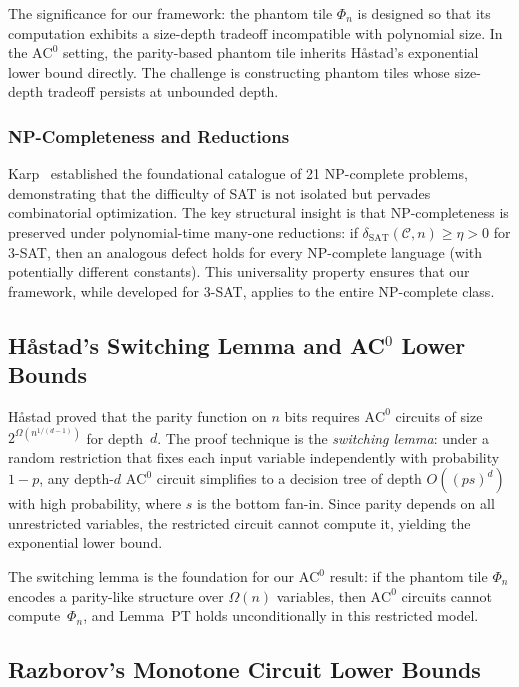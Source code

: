 \documentclass[11pt]{article}
\theoremstyle{definition}
\theoremstyle{remark}
\newcommand{\calC}{\mathcal{C}}
\newcommand{\ACz}{\mathrm{AC}^0}
\newcommand{\dSAT}{\delta_{\mathrm{SAT}}}
\begin{document}
\noindent
The significance for our framework: the phantom tile $\Phi_n$ is designed
so that its computation exhibits a size-depth tradeoff incompatible with
polynomial size.  In the $\ACz$ setting, the parity-based phantom tile
inherits H\aa stad's exponential lower bound directly.  The challenge
is constructing phantom tiles whose size-depth tradeoff persists at
unbounded depth.

\subsubsection{NP-Completeness and Reductions}

Karp~\cite{Karp72} established the foundational catalogue of 21 NP-complete
problems, demonstrating that the difficulty of SAT is not isolated but
pervades combinatorial optimization.  The key structural insight is that
NP-completeness is preserved under polynomial-time many-one reductions:
if $\dSAT(\calC, n) \geq \eta > 0$ for 3-SAT, then an analogous defect
holds for every NP-complete language (with potentially different constants).
This universality property ensures that our framework, while developed
for 3-SAT, applies to the entire NP-complete class.

\subsection{H\aa stad's Switching Lemma and AC$^0$ Lower Bounds}

H\aa stad \cite{Hastad} proved that the parity function on $n$ bits
requires $\ACz$ circuits of size $2^{\Omega(n^{1/(d-1)})}$ for depth~$d$.
The proof technique is the \emph{switching lemma}: under a random restriction
that fixes each input variable independently with probability $1-p$,
any depth-$d$ $\ACz$ circuit simplifies to a decision tree of depth
$O((ps)^d)$ with high probability, where $s$ is the bottom fan-in.
Since parity depends on all unrestricted variables, the restricted circuit
cannot compute it, yielding the exponential lower bound.

The switching lemma is the foundation for our $\ACz$ result: if the
phantom tile $\Phi_n$ encodes a parity-like structure over $\Omega(n)$
variables, then $\ACz$ circuits cannot compute~$\Phi_n$, and
Lemma~PT holds unconditionally in this restricted model.

\subsection{Razborov's Monotone Circuit Lower Bounds}
\end{document}
